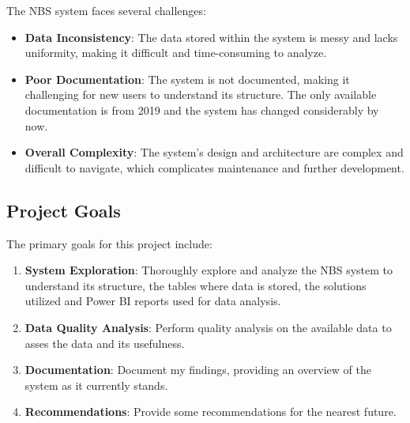 The NBS system faces several challenges:
\begin{itemize}
	\item \textbf{Data Inconsistency}: The data stored within the system is messy and lacks uniformity, making it difficult and time-consuming to analyze.
	\item \textbf{Poor Documentation}: The system is not documented, making it challenging for new users to understand its structure. The only available documentation is from 2019 and the system has changed considerably by now.
	\item \textbf{Overall Complexity}: The system's design and architecture are complex and difficult to navigate, which complicates maintenance and further development.
\end{itemize}

\subsection{Project Goals}
The primary goals for this project include:
\begin{enumerate}
	\item \textbf{System Exploration}: Thoroughly explore and analyze the NBS system to understand its structure, the tables where data is stored, the solutions utilized and Power BI reports used for data analysis.
	\item \textbf{Data Quality Analysis}: Perform quality analysis on the available data to asses the data and its usefulness.
	\item \textbf{Documentation}: Document my findings, providing an overview of the system as it currently stands.
	\item \textbf{Recommendations}: Provide some recommendations for the nearest future.
\end{enumerate}